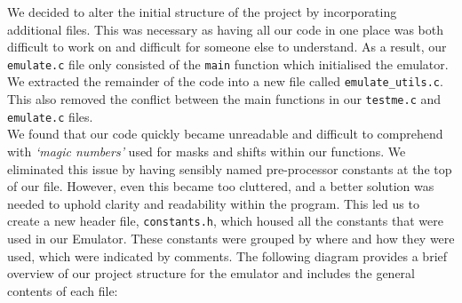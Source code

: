 \documentclass[10pt]{article}
\begin{document}
We decided to alter the initial structure of the project by incorporating additional files. This was necessary as having all our code in one place was both difficult to work on and difficult for someone else to understand. As a result, our {\tt emulate.c} file only consisted of the {\tt main} function which initialised the emulator. We extracted the remainder of the code into a new file called {\tt emulate\_utils.c}. This also removed the conflict between the main functions in our {\tt testme.c} and {\tt emulate.c} files.
 \\

We found that our code quickly became unreadable and difficult to comprehend with \textsl{‘magic numbers’} used for masks and shifts within our functions. We eliminated this issue by having sensibly named pre-processor constants at the top of our file. However, even this became too cluttered, and a better solution was needed to uphold clarity and readability within the program. This led us to create a new header file, {\tt constants.h}, which housed all the constants that were used in our Emulator. These constants were grouped by where and how they were used, which were indicated by comments. The following diagram provides a brief overview of our project structure for the emulator and includes the
general contents of each file:

\vspace{0.5cm}

\end{document}
